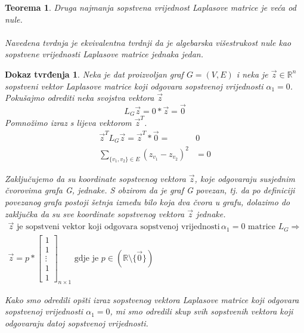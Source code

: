 \documentclass[11pt]{article}
\newtheorem{theorem}{Teorema}
\newtheorem*{custom_proof}{Dokaz tvrđenja}
\begin{document}
	\begin{theorem} Druga najmanja sopstvena vrijednost Laplasove matrice je veća od nule.
	\paragraph{}
	Navedena tvrdnja je ekvivalentna tvrdnji da je algebarska višestrukost nule kao sopstvene vrijednosti Laplasove matrice jednaka jedan.
	\end{theorem}
	
	\begin{custom_proof}
	Neka je dat proizvoljan graf $G=(V,E)$ i neka je $\vec{z} \in \mathbb{R}^n$ sopstveni vektor Laplasove matrice koji odgovara sopstvenoj vrijednosti $\alpha_1 = 0$.
	Pokušajmo odrediti neka svojstva vektora $\vec{z}$
	\[
		L_G\vec{z} = 0 * \vec{z} = \vec{0}
	\]
	Pomnožimo izraz s lijeva vektorom $\vec{z}^T$.
	\[
		\begin{split}
			\vec{z}^T L_G \vec{z} = \vec{z}^T * \vec{0} = &0 \\
			\sum_{\{v_1,v_2\} \in E} (z_{v_1} - z_{v_2})^2 &= 0
		\end{split}
	\]
	
	Zaključujemo da su koordinate sopstvenog vektora $\vec{z}$, koje odgovaraju susjednim čvorovima grafa G, jednake.
	S obzirom da je graf G povezan, tj. da po definiciji povezanog grafa postoji šetnja između bilo koja dva čvora u grafu,
	dolazimo do zaključka da su sve koordinate sopstvenog vektora $\vec{z}$ jednake. 
	\[
	\begin{split}
	 \vec{z} \text{ je sopstveni vektor koji odgovara sopstvenoj vrijednosti } & \alpha_1 = 0 \text{ matrice }  L_G \Rightarrow \\
	 \vec{z} =p *
	\begin{bmatrix} 
	1 \\ 1 \\ \vdots \\ 1 \\ 1
	\end{bmatrix}_{n \times 1}
	\text{ gdje je } p \in (\mathbb{R} \setminus \{\vec{0}\})
	\end{split}
	\]

	Kako smo odredili opšti izraz sopstvenog vektora Laplasove matrice koji odgovara sopstvenoj vrijednosti $\alpha_1 = 0$,
	mi smo odredili skup svih sopstvenih vektora koji odgovaraju datoj sopstvenoj vrijednosti.
	

\end{custom_proof}
\end{document}
